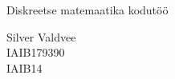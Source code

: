\begin{titlepage}
\centering
\vspace*{\fill}
\Huge{Diskreetse matemaatika kodutöö}
\begin{flushright}
\large{
Silver Valdvee\\
IAIB179390\\
IAIB14}
\end{flushright}
\vspace*{\fill}
\thispagestyle{firstpage}
\end{titlepage}